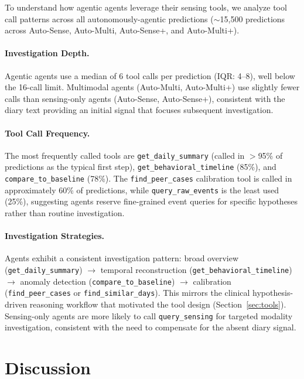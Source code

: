 \documentclass[screen,review,anonymous]{acmart}
\begin{document}
To understand how agentic agents leverage their sensing tools, we analyze tool call patterns across all autonomously-agentic predictions (${\sim}$15,500 predictions across Auto-Sense, Auto-Multi, Auto-Sense+, and Auto-Multi+).

\paragraph{Investigation Depth.} Agentic agents use a median of 6 tool calls per prediction (IQR: 4--8), well below the 16-call limit. Multimodal agents (Auto-Multi, Auto-Multi+) use slightly fewer calls than sensing-only agents (Auto-Sense, Auto-Sense+), consistent with the diary text providing an initial signal that focuses subsequent investigation.

\paragraph{Tool Call Frequency.} The most frequently called tools are \texttt{get\_daily\_summary} (called in $>$95\% of predictions as the typical first step), \texttt{get\_behavioral\_timeline} (85\%), and \texttt{compare\_to\_baseline} (78\%). The \texttt{find\_peer\_cases} calibration tool is called in approximately 60\% of predictions, while \texttt{query\_raw\_events} is the least used (25\%), suggesting agents reserve fine-grained event queries for specific hypotheses rather than routine investigation.

\paragraph{Investigation Strategies.} Agents exhibit a consistent investigation pattern: broad overview (\texttt{get\_daily\_summary}) $\rightarrow$ temporal reconstruction (\texttt{get\_behavioral\_timeline}) $\rightarrow$ anomaly detection (\texttt{compare\_to\_baseline}) $\rightarrow$ calibration (\texttt{find\_peer\_cases} or \texttt{find\_similar\_days}). This mirrors the clinical hypothesis-driven reasoning workflow that motivated the tool design (Section~\ref{sec:tools}). Sensing-only agents are more likely to call \texttt{query\_sensing} for targeted modality investigation, consistent with the need to compensate for the absent diary signal.


\section{Discussion}
\end{document}
